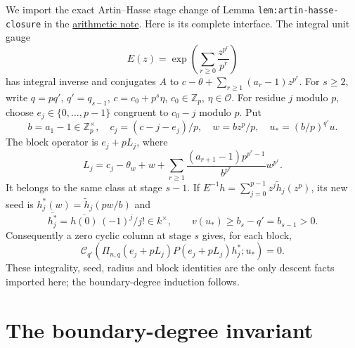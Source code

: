 \documentclass[11pt]{article}
\begin{document}
We import the exact Artin--Hasse stage change of Lemma
\texttt{lem:artin-hasse-closure} in the
\href{ARITHMETIC_FRONTIER_TERMINAL_ORDERS.tex}{arithmetic note}.
Here is its complete interface. The integral unit gauge
\[
 E(z)=\exp\left(\sum_{r\ge0}\frac{z^{p^r}}{p^r}\right)
\]
has integral inverse and conjugates $A$ to
$c-\theta+\sum_{r\ge1}(a_r-1)z^{p^r}$.
For $s\ge2$, write $q=pq'$, $q'=q_{s-1}$,
$c=c_0+p^s\eta$, $c_0\in\mathbb Z_p$, $\eta\in\mathcal O$.
For residue $j$ modulo $p$, choose $e_j\in\{0,\ldots,p-1\}$
congruent to $c_0-j$ modulo $p$. Put
\[
 b=a_1-1\in\mathbb Z_p^\times,\quad
 c_j=(c-j-e_j)/p,\quad
 w=bz^p/p,\quad u_*=(b/p)^{q'}u.
\]
The block operator is $e_j+pL_j$, where
\[
 L_j=c_j-\theta_w+w+
 \sum_{r\ge1}\frac{(a_{r+1}-1)p^{p^r-1}}{b^{p^r}}w^{p^r}.
\]
It belongs to the same class at stage $s-1$.
If $E^{-1}h=\sum_{j=0}^{p-1}z^j\widetilde h_j(z^p)$,
its new seed is $h_j^*(w)=\widetilde h_j(pw/b)$ and
\[
 \overline{h_j^*}
 =\overline{h(0)}\,(-1)^j/j!\in k^\times,\qquad
 v(u_*)\ge b_s-q'=b_{s-1}>0.
\]
Consequently a zero cyclic column at stage $s$ gives, for each block,
\[
 \mathcal C_{q'}\!\left(
 \Pi_{n,q}(e_j+pL_j)P(e_j+pL_j)h_j^*;u_*\right)=0.       \tag{1}\label{eq:block}
\]
These integrality, seed, radius and block identities are the only
descent facts imported here; the boundary-degree induction follows.

\section{The boundary-degree invariant}
\end{document}
